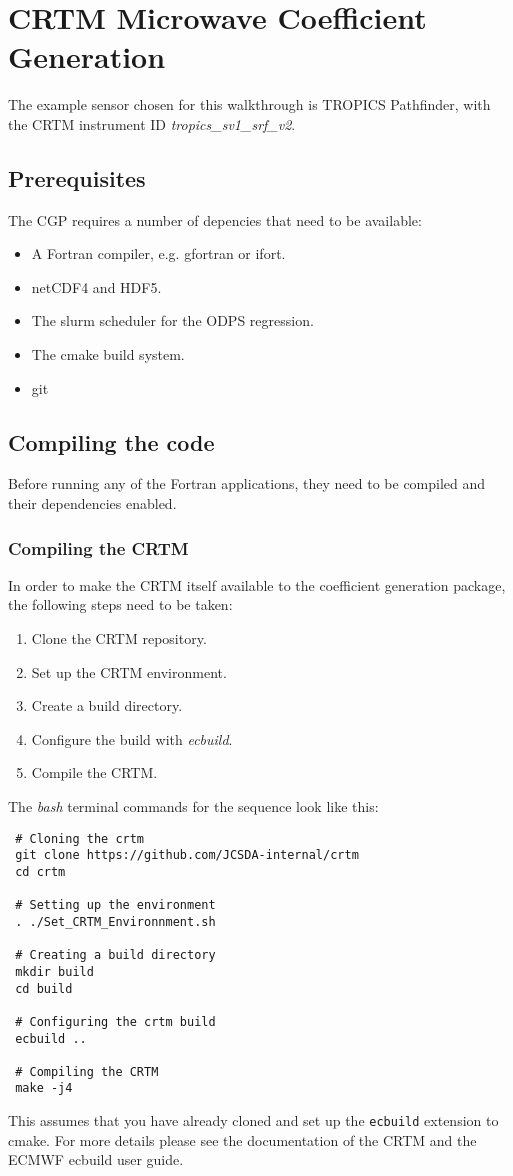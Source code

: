 \section{CRTM Microwave Coefficient Generation}
The example sensor chosen for this walkthrough is TROPICS Pathfinder, with the CRTM instrument ID \emph{tropics\_sv1\_srf\_v2}.

\subsection{Prerequisites}
The CGP requires a number of depencies that need to be available:
\begin{itemize}
  \item A Fortran compiler, e.g. gfortran or ifort.
  \item netCDF4 and HDF5.
  \item The slurm scheduler for the ODPS regression.
  \item The cmake build system.
  \item git
\end{itemize}

\subsection{Compiling the code}
Before running any of the Fortran applications, they need to be compiled and their dependencies enabled.

\subsubsection{Compiling the CRTM}
In order to make the CRTM itself available to the coefficient generation package, the following steps need to be taken:
\begin{enumerate}
  \item Clone the CRTM repository.
  \item Set up the CRTM environment.
  \item Create a build directory.
  \item Configure the build with \emph{ecbuild}.
  \item Compile the CRTM.
\end{enumerate}
The \emph{bash} terminal commands for the sequence look like this:
\begin{verbatim}
 # Cloning the crtm
 git clone https://github.com/JCSDA-internal/crtm
 cd crtm

 # Setting up the environment
 . ./Set_CRTM_Environnment.sh

 # Creating a build directory
 mkdir build
 cd build

 # Configuring the crtm build
 ecbuild ..

 # Compiling the CRTM
 make -j4
\end{verbatim}
This assumes that you have already cloned and set up the \verb|ecbuild| extension to cmake. For more details please see the documentation of the CRTM and the ECMWF ecbuild user guide.

